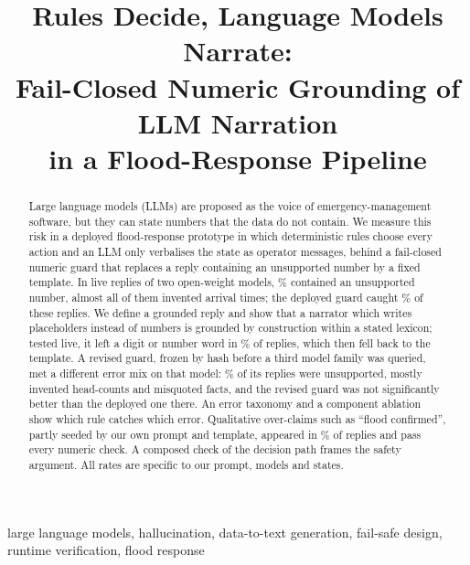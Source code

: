 \documentclass[conference]{IEEEtran}
\begin{document}
\title{Rules Decide, Language Models Narrate:\\
Fail-Closed Numeric Grounding of LLM Narration\\
in a Flood-Response Pipeline}

\author{
}

\maketitle

\begin{abstract}
Large language models (LLMs) are proposed as the voice of emergency-management software, but they can state numbers that the data do not contain. We measure this risk in a deployed flood-response prototype in which deterministic rules choose every action and an LLM only verbalises the state as operator messages, behind a fail-closed numeric guard that replaces a reply containing an unsupported number by a fixed template. In \LiveN{} live replies of two open-weight models, \LiveUnsupPct\% contained an unsupported number, almost all of them invented arrival times; the deployed guard caught \LiveDepRec\% of these replies. We define a grounded reply and show that a narrator which writes placeholders instead of numbers is grounded by construction within a stated lexicon; tested live, it left a digit or number word in \VarSlotsViol\% of replies, which then fell back to the template. A revised guard, frozen by hash before a third model family was queried, met a different error mix on that model: \HoUnsupPct\% of its replies were unsupported, mostly invented head-counts and misquoted facts, and the revised guard was not significantly better than the deployed one there. An error taxonomy and a component ablation show which rule catches which error. Qualitative over-claims such as ``flood confirmed'', partly seeded by our own prompt and template, appeared in \OcDevPct\% of replies and pass every numeric check. A composed check of the decision path frames the safety argument. All rates are specific to our prompt, models and states.
\end{abstract}

\begin{IEEEkeywords}
large language models, hallucination, data-to-text generation, fail-safe design, runtime verification, flood response
\end{IEEEkeywords}
\end{document}
